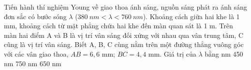 \begin{vidu} %
 Tiến hành thí nghiệm Young về giao thoa ánh sáng, nguồn sáng phát ra ánh sáng đơn sắc có bước sóng $\lambda $ ($380\ nm < \lambda  < 760\ nm$). Khoảng cách giữa hai khe là 1 mm, khoảng cách từ mặt phẳng chứa hai khe đến màn quan sát là 1 m. Trên màn hai điểm A và B là vị trí vân sáng đối xứng với nhau qua vân trung tâm, C cũng là vị trí vân sáng. Biết A, B, C cùng nằm trên một đường thẳng vuông góc với các vân giao thoa, $AB = 6,6$ mm; $BC = 4,4$ mm. Giá trị của $\lambda $ bằng
\choice
{ nm}
{450 nm}
{750 nm}
{650 nm}
\end{vidu} 